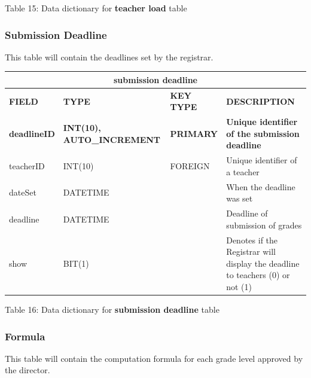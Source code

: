 \documentclass[11pt,a4paper,titlepage]{article}
\begin{document}
\vspace{.5cm}
\begin{center}
    Table 15: Data dictionary for \textbf{teacher load} table
\end{center}

\newpage

\subsubsection{Submission Deadline}

This table will contain the deadlines set by the registrar.

\vspace{1cm}
\begin{longtable}{ |p{2.5cm}|p{4.5cm}|p{2.5cm}|p{3cm}|  }
    \hline
    \multicolumn{4}{|c|}{\textbf{submission deadline}} \\
    \hline
    \textbf{FIELD}&\textbf{TYPE}&\textbf{KEY TYPE}&\textbf{DESCRIPTION}\\
    \hline
    \textbf{deadlineID}  & \textbf{INT(10), AUTO\_INCREMENT} & \textbf{PRIMARY} & \textbf{Unique identifier of the submission deadline}\\ \hline
    teacherID   & INT(10) & FOREIGN & Unique identifier of a teacher\\ \hline
    dateSet   & DATETIME &  & When the deadline was set\\ \hline
    deadline   & DATETIME &  & Deadline of submission of grades\\ \hline
    show   & BIT(1) &  & Denotes if the Registrar will display the deadline to teachers (0) or not (1)\\ \hline
\end{longtable}

\vspace{.5cm}
\begin{center}
    Table 16: Data dictionary for \textbf{submission deadline} table
\end{center}

\newpage

\subsubsection{Formula}

This table will contain the computation formula for each grade level approved by the director.
\end{document}
